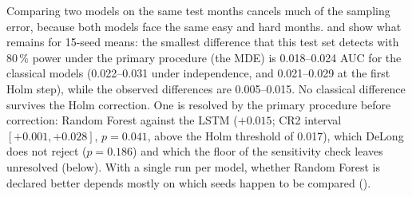 \documentclass[11pt,a4paper]{article}
\begin{document}
\begin{table}[htbp]
\centering
\caption{Noise budget for one AUC (15 seeds per model, 529 test rows). iid: DeLong; block: calendar-year block bootstrap ($B=2{,}000$, 19 years). Seed share: $\sigma_{\text{seed}}^2/(\sigma_{\text{seed}}^2+\text{SE}^2)$, with the DeLong or the block standard error.}
\label{tab:budget}
{\small
{}%
}
\end{table}

Comparing two models on the same test months cancels much of the sampling error, because both models face the same easy and hard months.  and  show what remains for 15-seed means: the smallest difference that this test set detects with 80\,\% power under the primary procedure (the MDE) is 0.018--0.024 AUC for the classical models (0.022--0.031 under independence, and 0.021--0.029 at the first Holm step), while the observed differences are 0.005--0.015. No classical difference survives the Holm correction. One is resolved by the primary procedure before correction: Random Forest against the LSTM ($+0.015$; CR2 interval $[+0.001,+0.028]$, $p=0.041$, above the Holm threshold of 0.017), which DeLong does not reject ($p=0.186$) and which the floor of the sensitivity check leaves unresolved (below). With a single run per model, whether Random Forest is declared better depends mostly on which seeds happen to be compared ().
\end{document}
